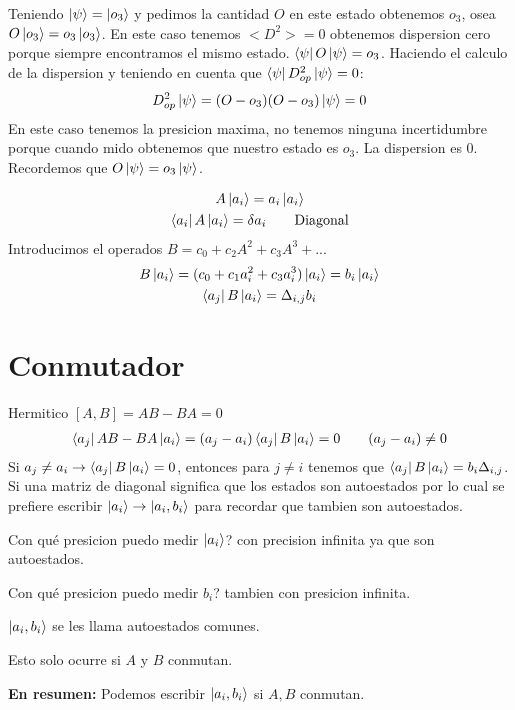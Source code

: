 \documentclass{article}
\newcommand{\caja}[3]{%
  \begin{tcolorbox}[colback=#1!5!white,colframe=#1!25!black,title=#2]
    #3
  \end{tcolorbox}%
}
\begin{document}
Teniendo $ \ket{\psi} = \ket{o_3 } $ y pedimos la cantidad $ O  $ en este estado obtenemos $ o_3  $, osea $ O \ket{o_3 } = o_3 \ket{o_3 } $. En este caso tenemos $ <D ^2> = 0  $ obtenemos dispersion cero porque siempre encontramos el mismo estado. $ \bra{\psi}O \ket{\psi} = o_3   $. Haciendo el calculo de la dispersion y teniendo en cuenta que $ \bra{\psi}D _{op } ^2\ket{\psi}  =0 $:
\begin{gather}
   D _{op } ^2 \ket{\psi} = (O-o_3)(O-o_3)\ket{\psi} = 0
\end{gather}
En este caso tenemos la presicion maxima, no tenemos ninguna incertidumbre porque cuando mido obtenemos que nuestro estado es $ o_3 $. La dispersion es 0. Recordemos que $ O \ket{\psi} = o_3 \ket{\psi} $.

\caja{black}{$ \bra{a_j }\ket{a_i }\text{=}\Delta _{i,j}   $ es normal y completa}{
  \begin{gather}
     A \ket{a_i } = a_i \ket{a_i }\\
     \bra{a_i }A \ket{a_i } = \delta a_i \qquad \text{Diagonal} 
  \end{gather}
  Introducimos el operados $ B = c _{0 } + c _{2 } A ^2 + c_3 A ^{3}+ ... $
  \begin{gather}
     B \ket{a_i } = (c_0 +c_1 a_i ^ {2 } + c_3 a_i ^ {3 })\ket{a_i} = b_i \ket{a_i } \\
     \bra{a_j }B \ket{a_i } = \Delta _{i,j } b_i  
  \end{gather}
}
\section{Conmutador }
Hermitico $ [A,B] = AB- BA = 0 $
\begin{gather}
  \bra{a_j }AB-BA \ket{a_i }= (a_j -a_i ) \bra{a_j }B \ket{a_i } = 0 \qquad (a_j-a_i)\neq 0 
\end{gather}
Si $ a_j \neq a_i \rightarrow \bra{a_j }B \ket{a_i } = 0   $, entonces para $ j \neq i  $ tenemos que $ \bra{a_j }B \ket{a_i } = b_i \Delta _{i,j }   $. Si una matriz de diagonal significa que los estados son autoestados por lo cual se prefiere escribir $ \ket{a_i } \rightarrow \ket{a_i ,b_i } $ para recordar que tambien son autoestados.

\caja{black}{Estado y autoesado }{
  Con qué presicion puedo medir $ \ket{a_i } $? con precision infinita ya que son autoestados. 

  Con qué presicion puedo medir $ b_i  $? tambien con presicion infinita.

  $ \ket{a_i, b_i } $ se les llama autoestados comunes.

  Esto solo ocurre si $ A  $ y $ B  $ conmutan.

  \tcblower

  \textbf{En resumen: }Podemos escribir $ \ket{a_i,b_i } $ si $ A,B  $ conmutan.
}
\end{document}
